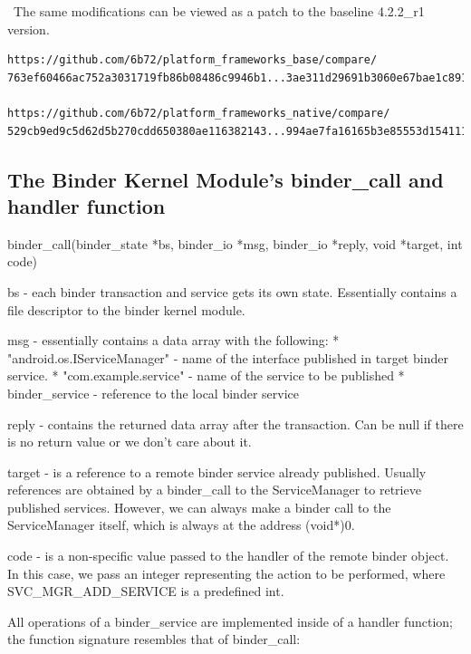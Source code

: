 \documentclass[prodmode]{acmlarge}
\begin{document}
\noindent~The same modifications can be viewed as a patch to the baseline 4.2.2\_r1 version.
\begin{Verbatim}
https://github.com/6b72/platform_frameworks_base/compare/
763ef60466ac752a3031719fb86b08486c9946b1...3ae311d29691b3060e67bae1c891fb8fbbc1be0f

https://github.com/6b72/platform_frameworks_native/compare/
529cb9ed9c5d62d5b270cdd650380ae116382143...994ae7fa16165b3e85553d154111df0a2f5a5af3
\end{Verbatim}

\pagebreak[4]
\subsection{The Binder Kernel Module's binder\_call and handler function}
\label{app:binder_call}

\begin{snippet}
binder_call(binder_state *bs, binder_io *msg, binder_io *reply, void *target, int code)

bs -     each binder transaction and service gets its own state.
         Essentially contains a file descriptor to the binder kernel module.

msg -    essentially contains a data array with the following:
         * "android.os.IServiceManager" - name of the interface published in
                                          target binder service.
          * "com.example.service"       - name of the service to be  published
          * binder_service              - reference to the local binder
                                          service

reply -   contains the returned data array after the transaction. Can be null
          if there is no return value or we don't care about it.

target -  is a reference to a remote binder service already published. Usually
          references are obtained by a binder_call to the ServiceManager to retrieve
          published services. However, we can always make a binder call to the
          ServiceManager itself, which is always at the address (void*)0.

code -    is a non-specific value passed to the handler of the remote binder object.
          In this case, we pass an integer representing the action to be performed, where SVC_MGR_ADD_SERVICE is a predefined int.
\end{snippet}

All operations of a binder\_service are implemented inside of a handler function; the function signature resembles that of binder\_call:
\end{document}
